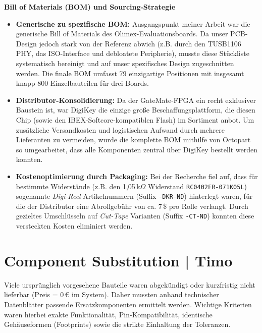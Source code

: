 \documentclass[a4paper,11pt]{article}
\begin{document}
\textbf{Bill of Materials (BOM) und Sourcing-Strategie}
\begin{itemize}
	\item \textbf{Generische zu spezifische BOM:} Ausgangspunkt meiner Arbeit war die generische Bill of Materials des Olimex-Evaluationsboards. Da unser PCB-Design jedoch stark von der Referenz abwich (z.B. durch den TUSB1106 PHY, das ISO-Interface und debloatete Peripherie), musste diese Stückliste systematisch bereinigt und auf unser spezifisches Design zugeschnitten werden. Die finale BOM umfasst 79 einzigartige Positionen mit insgesamt knapp 800 Einzelbauteilen für drei Boards.
	\item \textbf{Distributor-Konsolidierung:} Da der GateMate-FPGA ein recht exklusiver Baustein ist, war DigiKey die einzige große Beschaffungsplattform, die diesen Chip (sowie den IBEX-Softcore-kompatiblen Flash) im Sortiment anbot. Um zusätzliche Versandkosten und logistischen Aufwand durch mehrere Lieferanten zu vermeiden, wurde die komplette BOM mithilfe von Octopart so umgearbeitet, dass alle Komponenten zentral über DigiKey bestellt werden konnten.
	\item \textbf{Kostenoptimierung durch Packaging:} Bei der Recherche fiel auf, dass für bestimmte Widerstände (z.B. den 1,05\,k$\Omega$ Widerstand \texttt{RC0402FR-071K05L}) sogenannte \textit{Digi-Reel} Artikelnummern (Suffix \texttt{-DKR-ND}) hinterlegt waren, für die der Distributor eine Abrollgebühr von ca. 7\,\$ pro Rolle verlangt. Durch gezieltes Umschlüsseln auf \textit{Cut-Tape} Varianten (Suffix \texttt{-CT-ND}) konnten diese versteckten Kosten eliminiert werden.
\end{itemize}

\section{Component Substitution | Timo}
Viele ursprünglich vorgesehene Bauteile waren abgekündigt oder kurzfristig nicht lieferbar (Preis = 0\,€ im System). Daher mussten anhand technischer Datenblätter passende Ersatzkomponenten ermittelt werden. Wichtige Kriterien waren hierbei exakte Funktionalität, Pin-Kompatibilität, identische Gehäuseformen (Footprints) sowie die strikte Einhaltung der Toleranzen.
\end{document}
